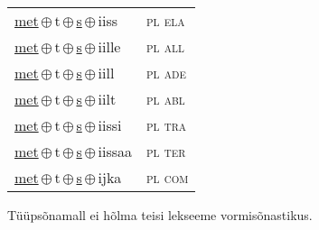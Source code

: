 \begin{minipage}{\textwidth}
\begin{sideways}
\begin{tabular}{l l}
\underline{met}\,$\oplus$\,t\,$\oplus$\,\underline{s}\,$\oplus$\,iiss & \textsc{ pl ela } \\
\underline{met}\,$\oplus$\,t\,$\oplus$\,\underline{s}\,$\oplus$\,iille & \textsc{ pl all } \\
\underline{met}\,$\oplus$\,t\,$\oplus$\,\underline{s}\,$\oplus$\,iill & \textsc{ pl ade } \\
\underline{met}\,$\oplus$\,t\,$\oplus$\,\underline{s}\,$\oplus$\,iilt & \textsc{ pl abl } \\
\underline{met}\,$\oplus$\,t\,$\oplus$\,\underline{s}\,$\oplus$\,iissi & \textsc{ pl tra } \\
\underline{met}\,$\oplus$\,t\,$\oplus$\,\underline{s}\,$\oplus$\,iissaa & \textsc{ pl ter } \\
\underline{met}\,$\oplus$\,t\,$\oplus$\,\underline{s}\,$\oplus$\,ijka & \textsc{ pl com } \\
\end{tabular}
\end{sideways}
\label{tab:tüüpsõnamall-mettse}

\end{minipage}

 
\vspace{1em}
\noindent Tüüpsõnamall  ei hõlma teisi lekseeme vormi\-sõnastikus.
